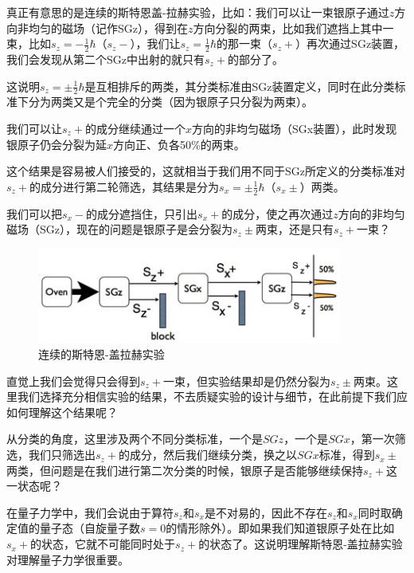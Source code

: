 真正有意思的是连续的斯特恩盖-拉赫实验，比如：我们可以让一束银原子通过$z$方向非均匀的磁场（记作SGz），得到在$z$方向分裂的两束，比如我们遮挡上其中一束，比如$s_z = - \frac{1}{2} \hbar$（$s_z -$），我们让$s_z = \frac{1}{2} \hbar$的那一束（$s_z +$）再次通过SGz装置，我们会发现从第二个SGz中出射的就只有$s_z +$的部分了。

这说明$s_z = \pm \frac{1}{2} \hbar$是互相排斥的两类，其分类标准由SGz装置定义，同时在此分类标准下分为两类又是个完全的分类（因为银原子只分裂为两束）。

我们可以让$s_z +$的成分继续通过一个$x$方向的非均匀磁场（SGx装置），此时发现银原子仍会分裂为延$x$方向正、负各50\%的两束。

这个结果是容易被人们接受的，这就相当于我们用不同于SGz所定义的分类标准对$s_z +$的成分进行第二轮筛选，其结果是分为$s_x = \pm \frac{1}{2} \hbar$（$s_x \pm$）两类。

我们可以把$s_x -$的成分遮挡住，只引出$s_x +$的成分，使之再次通过$z$方向的非均匀磁场（SGz），现在的问题是银原子是会分裂为$s_z \pm$两束，还是只有$s_z +$一束？

\begin{figure}[htbp]
\begin{center}
\includegraphics[width=10cm]{SGExperiment/SequentialSGE.jpg}
\caption{连续的斯特恩-盖拉赫实验}
\end{center}
\end{figure}

直觉上我们会觉得只会得到$s_z +$一束，但实验结果却是仍然分裂为$s_z \pm$两束。这里我们选择充分相信实验的结果，不去质疑实验的设计与细节，在此前提下我们应如何理解这个结果呢？

从分类的角度，这里涉及两个不同分类标准，一个是$SGz$，一个是$SGx$，第一次筛选，我们只筛选出$s_z +$的成分，然后我们继续分类，换之以$SGx$标准，得到$s_x \pm$两类，但问题是在我们进行第二次分类的时候，银原子是否能够继续保持$s_z +$这一状态呢？

在量子力学中，我们会说由于算符$s_z$和$s_x$是不对易的，因此不存在$s_z$和$s_x$同时取确定值的量子态（自旋量子数$s=0$的情形除外）。即如果我们知道银原子处在比如$s_x +$的状态，它就不可能同时处于$s_z +$的状态了。这说明理解斯特恩-盖拉赫实验对理解量子力学很重要。

